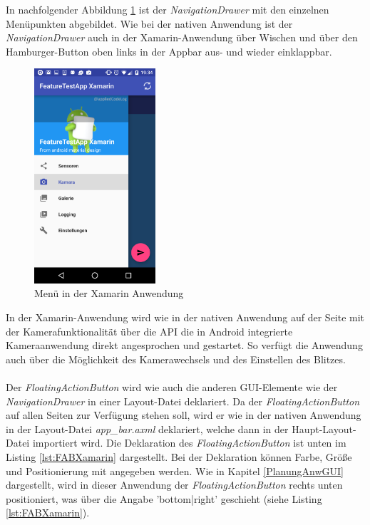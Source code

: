 In nachfolgender Abbildung \ref{fig:MenuXamarin} ist der \textit{NavigationDrawer} mit den einzelnen Menüpunkten abgebildet. Wie bei der nativen Anwendung ist der \textit{NavigationDrawer} auch in der Xamarin-Anwendung über Wischen und über den Hamburger-Button oben links in der Appbar aus- und wieder einklappbar.
\clearpage

\begin{figure}[h]
	\centering
	\includegraphics[width=0.4\textwidth]{Bilder/Screenshot_20170328-193448.PNG}
	\caption{Menü in der Xamarin Anwendung}
	\label{fig:MenuXamarin}
\end{figure}

In der Xamarin-Anwendung wird wie in der nativen Anwendung auf der Seite mit der Kamerafunktionalität über die API die in Android integrierte Kameraanwendung direkt angesprochen und gestartet. So verfügt die Anwendung auch über die Möglichkeit des Kamerawechsels und des Einstellen des Blitzes. 
\\
\\
Der \textit{FloatingActionButton} wird wie auch die anderen GUI-Elemente wie der \textit{NavigationDrawer} in einer Layout-Datei deklariert. Da der \textit{FloatingActionButton} auf allen Seiten zur Verfügung stehen soll, wird er wie in der nativen Anwendung in der Layout-Datei \textit{app\_bar.axml} deklariert, welche dann in der Haupt-Layout-Datei importiert wird. Die Deklaration des \textit{FloatingActionButton} ist unten im Listing \ref{lst:FABXamarin} dargestellt. Bei der Deklaration können Farbe, Größe und Positionierung mit angegeben werden. Wie in Kapitel \ref{PlanungAnwGUI} dargestellt, wird in dieser Anwendung der \textit{FloatingActionButton} rechts unten positioniert, was über die Angabe 'bottom|right' geschieht (siehe Listing \ref{lst:FABXamarin}). 
\clearpage

